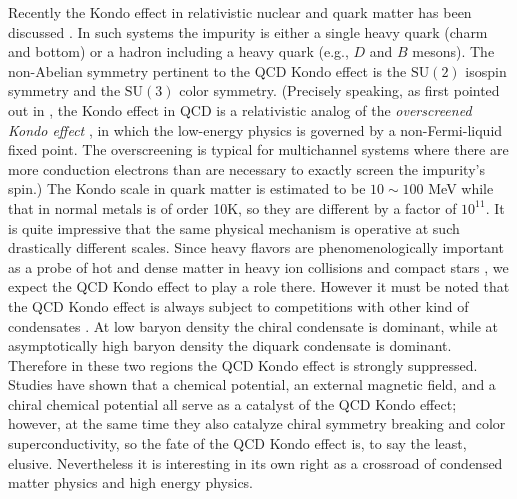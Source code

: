 \documentclass[aps,prd,longbibliography,reprint]{revtex4-2}
\newcommand{\SU}{\text{SU}}
\newcommand{\1}{\mathbbm{1}}
\begin{document}
Recently the Kondo effect in relativistic nuclear and quark matter has been discussed \cite{Yasui:2013xr,Hattori:2015hka,Ozaki:2015sya,Yasui:2016ngy,Yasui:2016svc,Kanazawa:2016ihl,Yasui:2017izi,Suzuki:2017gde,Kimura:2018vxj,Hattori:2019zig,Suenaga:2019jqu}. In such systems the impurity is either a single heavy quark (charm and bottom) or a hadron including a heavy quark (e.g., $D$ and $B$ mesons). The non-Abelian symmetry pertinent to the QCD Kondo effect is the $\SU(2)$ isospin symmetry and the $\SU(3)$ color symmetry. (Precisely speaking, as first pointed out in \cite{Kanazawa:2016ihl}, the Kondo effect in QCD is a relativistic analog of the \emph{overscreened Kondo effect} \cite{Nozieres1980,Affleck:1990zd,Affleck:1990iv,Parcollet:1997ysb}, in which the low-energy physics is governed by a non-Fermi-liquid fixed point. The overscreening is typical for multichannel systems where there are more conduction electrons than are necessary to exactly screen the impurity's spin.) The Kondo scale in quark matter is estimated to be $10\sim100$ MeV \cite{Yasui:2016svc,Suzuki:2017gde} while that in normal metals is of order 10K, so they are different by a factor of $10^{11}$. It is quite impressive that the same physical mechanism is operative at such drastically different scales. Since heavy flavors are phenomenologically important as a probe of hot and dense matter in heavy ion collisions and compact stars \cite{Neubert:1993mb,Neubert:1996wg,manohar_wise_2000,Hosaka:2016ypm}, we expect the QCD Kondo effect to play a role there. However it must be noted that the QCD Kondo effect is always subject to competitions with other kind of condensates \cite{Kanazawa:2016ihl,Suzuki:2017gde}. At low baryon density the chiral condensate is dominant, while at asymptotically high baryon density the diquark condensate is dominant. Therefore in these two regions the QCD Kondo effect is strongly suppressed. Studies \cite{Hattori:2015hka,Ozaki:2015sya,Suenaga:2019jqu} have shown that a chemical potential, an external magnetic field, and a chiral chemical potential all serve as a catalyst of the QCD Kondo effect; however, at the same time they also catalyze chiral symmetry breaking and color superconductivity, so the fate of the QCD Kondo effect is, to say the least, elusive. Nevertheless it is interesting in its own right as a crossroad of condensed matter physics and high energy physics. 
\end{document}
